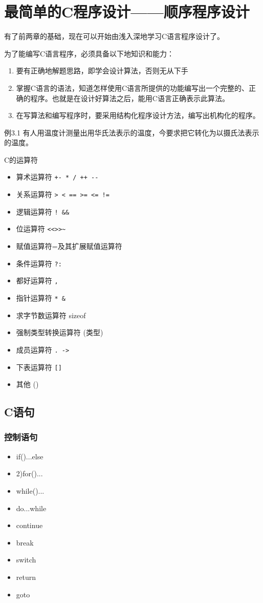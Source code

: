 \chapter{最简单的C程序设计——顺序程序设计}

有了前两章的基础，现在可以开始由浅入深地学习C语言程序设计了。

为了能编写C语言程序，必须具备以下地知识和能力：
\begin{enumerate}
	\item 要有正确地解题思路，即学会设计算法，否则无从下手
	\item 掌握C语言的语法，知道怎样使用C语言所提供的功能编写出一个完整的、正确的程序。也就是在设计好算法之后，能用C语言正确表示此算法。
	\item 在写算法和编写程序时，要采用结构化程序设计方法，编写出机构化的程序。
\end{enumerate}
例3.1 有人用温度计测量出用华氏法表示的温度，今要求把它转化为以摄氏法表示的温度。

C的运算符
\begin{itemize}
	\item 算术运算符	\verb|+- * / ++ --|
	\item 关系运算符	\verb|> < == >= <= !=|
	\item 逻辑运算符 	\verb|! && |
	\item 位运算符		\verb|<<>>~ |
	\item 赋值运算符=及其扩展赋值运算符
	\item 条件运算符	\verb|?:|
	\item 都好运算符	\verb|,|
	\item 指针运算符	\verb|* &|
	\item 求字节数运算符	sizeof
	\item 强制类型转换运算符	(类型)
	\item 成员运算符	\verb|. ->|
	\item 下表运算符	\verb|[]|
	\item 其他  ()
\end{itemize}

\section{C语句}

\subsection{控制语句}
\begin{itemize}
	\item if()...else
	\item 2)for()...
	\item while()...
	\item do...while
	\item continue
	\item break
	\item switch
	\item return 
	\item goto
\end{itemize}
